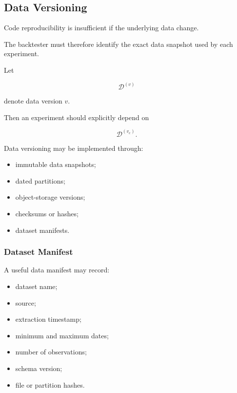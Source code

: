 \documentclass[11pt,a4paper]{article}
\begin{document}
\subsection{Data Versioning}
\label{subsec:data_versioning}

Code reproducibility is insufficient if the underlying data change.

The backtester must therefore identify the exact data snapshot used by each
experiment.

Let

\begin{equation}
\mathcal{D}^{(v)}
\end{equation}

denote data version $v$.

Then an experiment should explicitly depend on

\begin{equation}
\boxed{
\mathcal{D}^{(v_e)}.
}
\end{equation}

Data versioning may be implemented through:

\begin{itemize}
    \item immutable data snapshots;
    \item dated partitions;
    \item object-storage versions;
    \item checksums or hashes;
    \item dataset manifests.
\end{itemize}


\subsubsection{Dataset Manifest}

A useful data manifest may record:

\begin{itemize}
    \item dataset name;
    \item source;
    \item extraction timestamp;
    \item minimum and maximum dates;
    \item number of observations;
    \item schema version;
    \item file or partition hashes.
\end{itemize}
\end{document}
